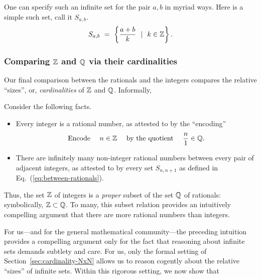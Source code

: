 \smallskip

One can specify such an infinite set for the pair $a,b$ in myriad ways.  Here is a simple such set, call it $S_{a,b}$.
\begin{equation}
\label{eq:between-rationals}
S_{a,b} \ = \ \left\{ \frac{a+b}{k} \ \ | \ \ k \in \mathbb{Z} \right\}.
\end{equation}

\subsubsection{Comparing $\mathbb{Z}$ and $\mathbb{Q}$ via their cardinalities}
\label{sec:Q-Z-cardinality}

Our final comparison between the rationals and the integers compares the relative ``sizes'', or, {\em cardinalities} of $\mathbb{Z}$ and $\mathbb{Q}$.  Informally, 

\smallskip

\hspace*{.35in}{\it Are there ``more'' rationals than integers?}

\medskip

\noindent Consider the following facts.
\begin{itemize}
\item
Every integer is a rational number, as attested to by the ``encoding''
\begin{equation}
\label{eq:ZintoQ}
\mbox{Encode } \ \ \ n \in \mathbb{Z} \ \ \ \mbox{ by the quotient } \ \ \ {n \over 1} \in \mathbb{Q} .
\end{equation}

\medskip\item
There are infinitely many non-integer rational numbers between every pair of adjacent integers, as attested to by every set $S_{n,n+1}$ as defined in Eq.~(\ref{eq:between-rationals}).
\end{itemize}
Thus, the set $\mathbb{Z}$ of integers is a {\em proper} subset of the set $\mathbb{Q}$ of rationals: symbolically, $\mathbb{Z} \subset \mathbb{Q}$.  To many, this subset relation provides an intuitively compelling argument that there are more rational numbers than integers.

For us---and for the general mathematical community---the preceding intuition provides a compelling argument only for the fact that reasoning about infinite sets demands subtlety and care.  For us, only the formal setting of Section~\ref{sec:cardinality-NxN} allows us to reason cogently about the relative ``sizes'' of infinite sets.  Within this rigorous setting, we now show that

